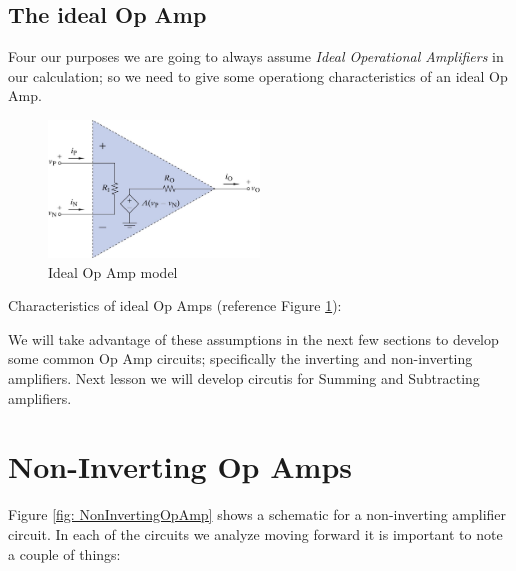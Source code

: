 \documentclass{handout}
\begin{document}
\subsection{The ideal Op Amp}
Four our purposes we are going to always assume {\em Ideal Operational Amplifiers} in our calculation; so we need to give some operationg characteristics of an ideal Op Amp.

\begin{figure} [h! t! b!]
\centering
\includegraphics[width=0.5\textwidth]{IdealOpAmpModel.jpg}
\caption{Ideal Op Amp model}
\label{fig: IdealOpAmp}
\end{figure}

Characteristics of ideal Op Amps (reference Figure \ref{fig: IdealOpAmp}):

We will take advantage of these assumptions in the next few sections to develop some common Op Amp circuits; specifically the inverting  and non-inverting amplifiers.  Next lesson we will develop circutis for Summing and Subtracting amplifiers.

\newpage
\clearpage
\pagebreak

\section{Non-Inverting Op Amps}
Figure \ref{fig: NonInvertingOpAmp} shows a schematic for a non-inverting amplifier circuit.  In each of the circuits we analyze moving forward it is important to note a couple of things:
\end{document}
